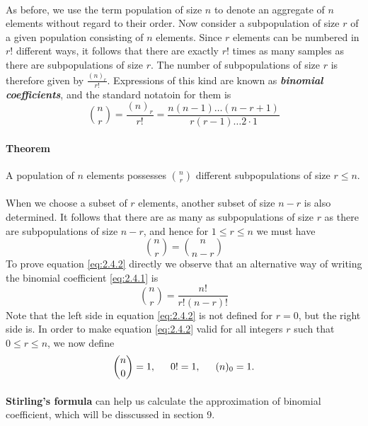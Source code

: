 \documentclass{article}
\numberwithin{equation}{subsection}
\begin{document}
			\paragraph{} As before, we use the term population of size $n$ to denote an aggregate of $n$ elements without regard to their order. Now consider a subpopulation of size $r$ of a given population consisting of $n$ elements. Since $r$ elements can be numbered in $r!$ different ways, it follows that there are exactly $r!$ times as many samples as there are subpopulations of size $r$. The number of subpopulations of size $r$ is therefore given by $\frac{(n)_r}{r!}$. Expressions of this kind are known as \textit{\textbf{binomial coefficients}}, and the standard notatoin for them is
			\begin{equation}
				\label{eq:2.4.1}
				{n \choose r} = \frac{(n)_r}{r!} = \frac{n(n-1)\dots(n-r+1)}{r(r-1)\dots 2\cdot 1}
			\end{equation}
			\paragraph{Theorem} A population of $n$ elements possesses $n \choose r$ different subpopulations of size $r \leq n$.
			\paragraph{} When we choose a subset of $r$ elements, another subset of size $n-r$ is also determined. It follows that there are as many as subpopulations of size $r$ as there are subpopulations of size $n-r$, and hence for $1 \leq r \leq n$ we must have
			\begin{equation}
				\label{eq:2.4.2}
				{n \choose r} = {n \choose n-r}
			\end{equation}
			To prove equation \eqref{eq:2.4.2} directly we observe that an alternative way of writing the binomial coefficient \eqref{eq:2.4.1} is
			\begin{equation}
				\label{eq:2.4.3}
				{n \choose r} = \frac{n!}{r!(n-r)!}
			\end{equation}
			Note that the left side in equation \eqref{eq:2.4.2} is not defined for $r=0$, but the right side is. In order to make equation \eqref{eq:2.4.2} valid for all integers $r$ such that $0\leq r\leq n$, we now define
			\begin{equation}
				\label{eq:2.4.4}
				{n \choose 0} = 1,\indent 0! = 1,\indent(n)_0 = 1.
			\end{equation}
			\paragraph{}\textbf{Stirling's formula} can help us calculate the approximation of binomial coefficient, which will be disscussed in section 9.
\end{document}
